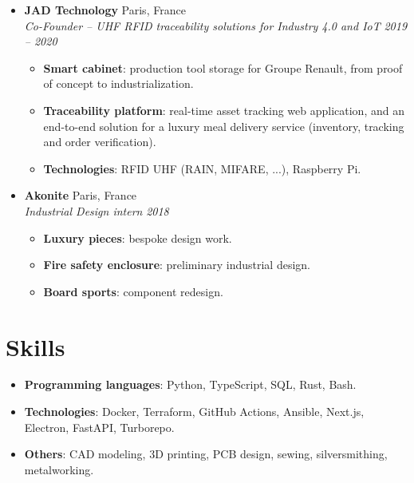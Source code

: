 \documentclass[a4paper,11pt]{article}
\newcommand{\entry}[4]{%
\item \textbf{#1} \hfill #2 \\
\textit{\small #3} \hfill \textit{\small #4}}
\newenvironment{entries}{
\begin{itemize}[leftmargin=1.2em, itemsep=4pt, parsep=0pt, topsep=0pt]}{
\end{itemize}}
\newenvironment{details}{
\begin{itemize}[label=$\circ$, leftmargin=1.5em, itemsep=0pt, parsep=0pt, topsep=2pt]\small}{
\end{itemize}}
\begin{document}
\begin{entries}
  \entry{JAD Technology}{Paris, France}{Co-Founder -- UHF RFID traceability solutions for
  Industry 4.0 and IoT}{2019 -- 2020}
  \begin{details}
  \item \textbf{Smart cabinet}: production tool storage for Groupe Renault, from proof of concept to
    industrialization.
  \item \textbf{Traceability platform}: real-time asset tracking web application, and an end-to-end
    solution for a luxury meal delivery service (inventory, tracking and order verification).
  \item \textbf{Technologies}: RFID UHF (RAIN, MIFARE, ...), Raspberry Pi.
  \end{details}

  \entry{Akonite}{Paris, France}{Industrial Design intern}{2018}
  \begin{details}
  \item \textbf{Luxury pieces}: bespoke design work.
  \item \textbf{Fire safety enclosure}: preliminary industrial design.
  \item \textbf{Board sports}: component redesign.
  \end{details}
\end{entries}

\section{Skills}
\begin{entries}
\item \textbf{Programming languages}: Python, TypeScript, SQL, Rust, Bash.
\item \textbf{Technologies}: Docker, Terraform, GitHub Actions, Ansible, Next.js,
  Electron, FastAPI, Turborepo.
\item \textbf{Others}: CAD modeling, 3D printing, PCB design, sewing, silversmithing,
  metalworking.
\end{entries}
\end{document}
